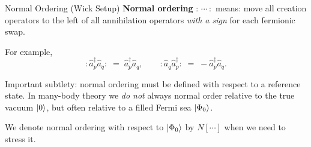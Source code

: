 \documentclass[aspectratio=169]{beamer}
\begin{document}
\begin{frame}{Normal Ordering (Wick Setup)}
\textbf{Normal ordering} $:\,\cdots\,:$ means: move all creation operators
to the left of all annihilation operators \emph{with a sign} for each fermionic swap.

For example,
\begin{equation}
    : \hat{a}^\dagger_p \hat{a}_q : \;=\; \hat{a}^\dagger_p \hat{a}_q,
\qquad
    : \hat{a}_q \hat{a}^\dagger_p :
    \;=\; - \hat{a}^\dagger_p \hat{a}_q.
\end{equation}

Important subtlety: normal ordering must be defined with respect to a
reference state. In many-body theory we \emph{do not} always normal order
relative to the true vacuum $\ket{0}$, but often relative to a filled Fermi
sea $\ket{\Phi_0}$.

We denote normal ordering with respect to $\ket{\Phi_0}$ by
$N[ \cdots ]$ when we need to stress it.
\end{frame}
\end{document}
